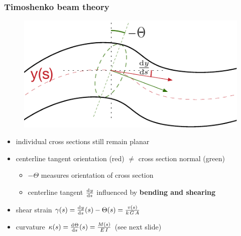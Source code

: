 \begin{frame}
  \frametitle{Timoshenko beam theory}
  \vspace{-2.5em}
  \begin{figure}
    \centering
    \includegraphics[width=16cm, keepaspectratio=true]{sections/traditional_beams/images/TimoshenkoBeam1}
  \end{figure}
  
  \begin{itemize}
    \item individual cross sections still remain planar
    \item centerline tangent orientation (red) $\neq$ cross section normal (green)
      \begin{itemize}
        \item $-\Theta$ measures orientation of cross section
        \item centerline tangent $\od{y}{s}$ influenced by \textbf{bending and shearing}
      \end{itemize}
    \item shear strain $\gamma(s) = \od{y}{s}(s) - \Theta(s) = \frac{v(s)}{k \, G \, A}$
    \item curvature $\kappa(s) = \od{\Theta}{s}(s) = \frac{M(s)}{E \, I}$ (see next slide)
  \end{itemize}
  
\end{frame}

